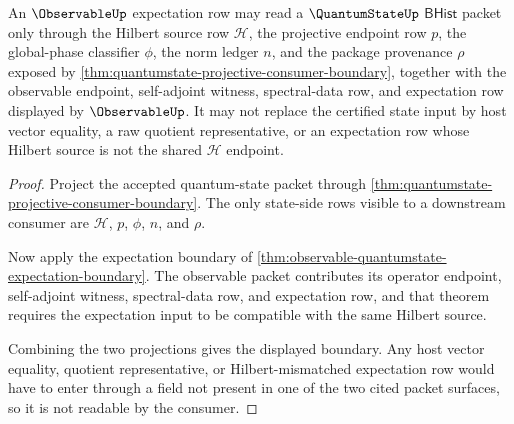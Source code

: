 \begin{theorem}
\label{thm:quantumstate-observable-state-boundary}
An $\ObservableUp$ expectation row may read a $\QuantumStateUp$ $\mathsf{BHist}$
packet only through the Hilbert source row $\mathcal{H}$, the projective
endpoint row $p$, the global-phase classifier $\phi$, the norm ledger $n$, and
the package provenance $\rho$ exposed by
\autoref{thm:quantumstate-projective-consumer-boundary}, together with the
observable endpoint, self-adjoint witness, spectral-data row, and expectation
row displayed by $\ObservableUp$. It may not replace the certified state input
by host vector equality, a raw quotient representative, or an expectation row
whose Hilbert source is not the shared $\mathcal{H}$ endpoint.
\end{theorem}
\begin{proof}
Project the accepted quantum-state packet through
\autoref{thm:quantumstate-projective-consumer-boundary}. The only state-side
rows visible to a downstream consumer are $\mathcal{H}$, $p$, $\phi$, $n$, and
$\rho$.

Now apply the expectation boundary of
\autoref{thm:observable-quantumstate-expectation-boundary}. The observable
packet contributes its operator endpoint, self-adjoint witness, spectral-data
row, and expectation row, and that theorem requires the expectation input to be
compatible with the same Hilbert source.

Combining the two projections gives the displayed boundary. Any host vector
equality, quotient representative, or Hilbert-mismatched expectation row would
have to enter through a field not present in one of the two cited packet
surfaces, so it is not readable by the consumer.
\end{proof}

